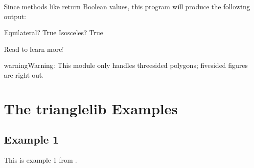 \documentclass[letterpaper,10pt,english]{sphinxmanual}
\begin{document}
\begin{sphinxVerbatim}[commandchars=\\\{\}]
   
    
 
 
\end{sphinxVerbatim}

Since methods like {\hyperref[\detokenize{api:trianglelib.shape.Triangle.is_equilateral}]{}}
return Boolean values, this program will produce the following output:

\begin{sphinxVerbatim}[commandchars=\\\{\}]
Equilateral? True
Isosceles? True
\end{sphinxVerbatim}

Read {\hyperref[\detokenize{guide::doc}]{}} to learn more!

\begin{sphinxadmonition}{warning}{Warning:}
This module only handles three\sphinxhyphen{}sided polygons;
five\sphinxhyphen{}sided figures are right out.
\end{sphinxadmonition}


\chapter{The trianglelib Examples}
\label{\detokenize{examples:the-trianglelib-examples}}\label{\detokenize{examples::doc}}

\section{Example 1}
\label{\detokenize{examples:example-1}}
This is example 1  from .
\end{document}
